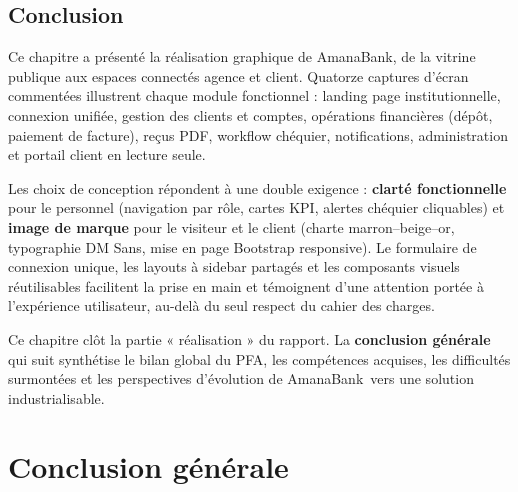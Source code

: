 \documentclass[11pt,a4paper,oneside]{report}
\newcommand{\nomapplication}{AmanaBank}
\begin{document}


\section{Conclusion}

Ce chapitre a présenté la réalisation graphique de \nomapplication, de la vitrine publique aux espaces connectés agence et client. Quatorze captures d'écran commentées illustrent chaque module fonctionnel : landing page institutionnelle, connexion unifiée, gestion des clients et comptes, opérations financières (dépôt, paiement de facture), reçus PDF, workflow chéquier, notifications, administration et portail client en lecture seule.

Les choix de conception répondent à une double exigence : \textbf{clarté fonctionnelle} pour le personnel (navigation par rôle, cartes KPI, alertes chéquier cliquables) et \textbf{image de marque} pour le visiteur et le client (charte marron--beige--or, typographie DM Sans, mise en page Bootstrap responsive). Le formulaire de connexion unique, les layouts à sidebar partagés et les composants visuels réutilisables facilitent la prise en main et témoignent d'une attention portée à l'expérience utilisateur, au-delà du seul respect du cahier des charges.

Ce chapitre clôt la partie « réalisation » du rapport. La \textbf{conclusion générale} qui suit synthétise le bilan global du PFA, les compétences acquises, les difficultés surmontées et les perspectives d'évolution de \nomapplication\ vers une solution industrialisable.

\clearpage
\chapter*{Conclusion générale}
\end{document}
